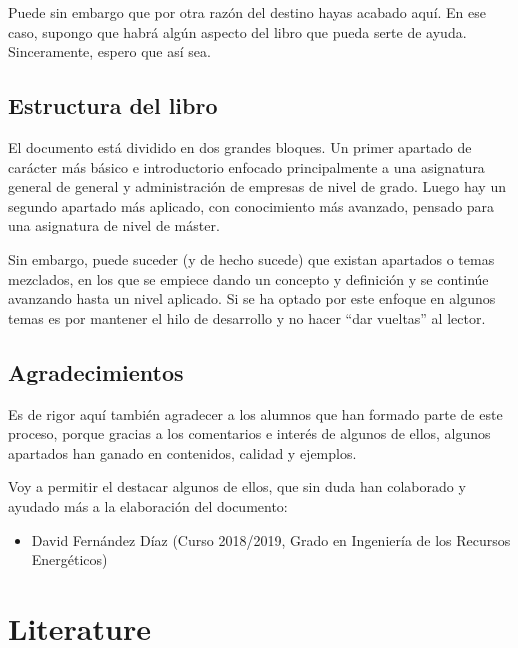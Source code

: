 \documentclass[
]{book}
\providecommand{\tightlist}{%
  \setlength{\itemsep}{0pt}\setlength{\parskip}{0pt}}
\begin{document}
Puede sin embargo que por otra razón del destino hayas acabado aquí. En ese caso, supongo que habrá algún aspecto del libro que pueda serte de ayuda. Sinceramente, espero que así sea.

\hypertarget{estructura-del-libro}{%
\section*{Estructura del libro}\label{estructura-del-libro}}

El documento está dividido en dos grandes bloques. Un primer apartado de carácter más básico e introductorio enfocado principalmente a una asignatura general de general y administración de empresas de nivel de grado. Luego hay un segundo apartado más aplicado, con conocimiento más avanzado, pensado para una asignatura de nivel de máster.

Sin embargo, puede suceder (y de hecho sucede) que existan apartados o temas mezclados, en los que se empiece dando un concepto y definición y se continúe avanzando hasta un nivel aplicado. Si se ha optado por este enfoque en algunos temas es por mantener el hilo de desarrollo y no hacer ``dar vueltas'' al lector.

\hypertarget{agradecimientos}{%
\section*{Agradecimientos}\label{agradecimientos}}

Es de rigor aquí también agradecer a los alumnos que han formado parte de este proceso, porque gracias a los comentarios e interés de algunos de ellos, algunos apartados han ganado en contenidos, calidad y ejemplos.

Voy a permitir el destacar algunos de ellos, que sin duda han colaborado y ayudado más a la elaboración del documento:

\begin{itemize}
\tightlist
\item
  David Fernández Díaz (Curso 2018/2019, Grado en Ingeniería de los Recursos Energéticos)
\end{itemize}

\hypertarget{literature}{%
\chapter{Literature}\label{literature}}
\end{document}
